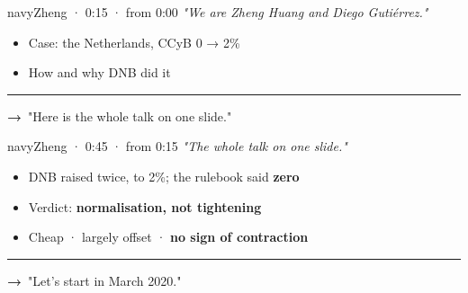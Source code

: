 \documentclass[10pt]{article}
\begin{document}
\begin{card}{navy}{\hfill{\normalsize\mdseries Zheng · 0:15 · from 0:00}}
{\large\itshape "We are Zheng Huang and Diego Gutiérrez."}\par\smallskip
\begin{itemize}[label=\textcolor{navy}{\textbullet}]\item Case: the Netherlands, CCyB 0 → 2\%\item How and why DNB did it\end{itemize}
\vfill\textcolor{grey}{\rule{\linewidth}{0.3pt}}\par{\bfseries\color{navy}→}\ "Here is the whole talk on one slide."
\end{card}
\hfill
\begin{card}{navy}{\hfill{\normalsize\mdseries Zheng · 0:45 · from 0:15}}
{\large\itshape "The whole talk on one slide."}\par\smallskip
\begin{itemize}[label=\textcolor{navy}{\textbullet}]\item DNB raised twice, to 2\%; the rulebook said \textbf{zero}\item Verdict: \textbf{normalisation, not tightening}\item Cheap · largely offset · \textbf{no sign of contraction}\end{itemize}
\vfill\textcolor{grey}{\rule{\linewidth}{0.3pt}}\par{\bfseries\color{navy}→}\ "Let's start in March 2020."
\end{card}


\vspace{0.35cm}
\end{document}
